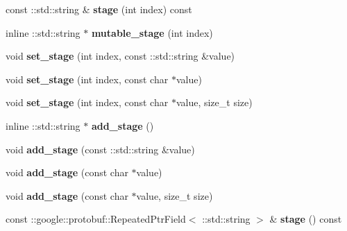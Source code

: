 \begin{DoxyCompactItemize}
const \+::std\+::string \& {\bfseries stage} (int index) const
\item 
\mbox{\label{classcaffe_1_1_net_state_aa4408fc025a4d39182109e37748fcecb}} 
inline \+::std\+::string $\ast$ {\bfseries mutable\+\_\+stage} (int index)
\item 
\mbox{\label{classcaffe_1_1_net_state_a5d044d31e26926191f83519ed6ac7d41}} 
void {\bfseries set\+\_\+stage} (int index, const \+::std\+::string \&value)
\item 
\mbox{\label{classcaffe_1_1_net_state_a92da4c280b7ca824405b89b09c706412}} 
void {\bfseries set\+\_\+stage} (int index, const char $\ast$value)
\item 
\mbox{\label{classcaffe_1_1_net_state_aca08b0549be884360c5fccd49175e24c}} 
void {\bfseries set\+\_\+stage} (int index, const char $\ast$value, size\+\_\+t size)
\item 
\mbox{\label{classcaffe_1_1_net_state_a52698bbe1655d863e3a106010da6e668}} 
inline \+::std\+::string $\ast$ {\bfseries add\+\_\+stage} ()
\item 
\mbox{\label{classcaffe_1_1_net_state_a52a8ff6dbfc2164598459ea2cb9880b1}} 
void {\bfseries add\+\_\+stage} (const \+::std\+::string \&value)
\item 
\mbox{\label{classcaffe_1_1_net_state_adc069473ed0a1f5f570bac84ea41291f}} 
void {\bfseries add\+\_\+stage} (const char $\ast$value)
\item 
\mbox{\label{classcaffe_1_1_net_state_a90d55428350f0811e534a01f0eb22ca2}} 
void {\bfseries add\+\_\+stage} (const char $\ast$value, size\+\_\+t size)
\item 
\mbox{\label{classcaffe_1_1_net_state_a27c508c11207de61471690d5e498eb9a}} 
const \+::google\+::protobuf\+::\+Repeated\+Ptr\+Field$<$ \+::std\+::string $>$ \& {\bfseries stage} () const
\item 
\mbox{\label{classcaffe_1_1_net_state_a274bc4a64230aee816a205bed18e1284}} 

\end{DoxyCompactItemize}
